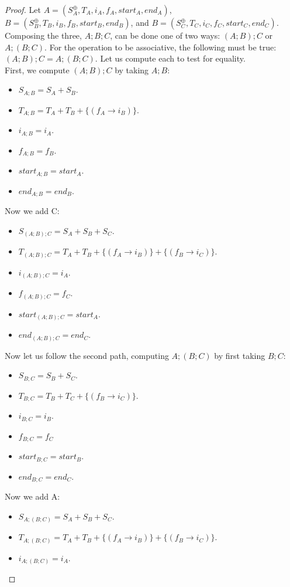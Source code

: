 \begin{proof}
Let $A = (S_A^\oplus, T_A, i_A, f_A, start_A, end_A)$, $B = (S_B^\oplus, T_B, i_B, f_B, start_B, end_B)$, and $B = (S_C^\oplus, T_C, i_C, f_C, start_C, end_C)$. Composing the three, $A;B;C$, can be done one of two ways: $(A;B);C$ or $ A;(B;C)$. For the operation to be associative, the following must be true: $(A;B);C = A;(B;C).$ Let us compute each to test for equality.\\
First, we compute $(A;B);C$ by taking $A;B$:
\begin{itemize}
 \item $S_{A;B} = S_A + S_B.$
 \item $T_{A;B} = T_A + T_B + \{(f_A \to i_B)\}$.
 \item $i_{A;B} = i_A$.
 \item $f_{A;B} = f_B$.
 \item $start_{A;B} = start_A.$
 \item $end_{A;B} = end_B. $
\end{itemize} 
Now we add C:
\begin{itemize}
 \item $S_{(A;B);C} = S_A + S_B + S_C.$
 \item $T_{(A;B);C} = T_A + T_B + \{(f_A \to i_B)\} + \{(f_B \to i_C)\}.$ 
 \item $i_{(A;B);C} = i_A$.
 \item $f_{(A;B);C} = f_C$.
 \item $start_{(A;B);C} = start_A.$
 \item $end_{(A;B);C} = end_C. $
\end{itemize}
Now let us follow the second path, computing $A;(B;C)$ by first taking $B;C$:
\begin{itemize}
 \item $S_{B;C} = S_B + S_C.$
 \item $T_{B;C} = T_B + T_C + \{(f_B \to i_C)\}.$
 \item $i_{B;C} = i_B$.
 \item $f_{B;C} = f_C$
 \item $start_{B;C} = start_B.$
 \item $end_{B;C} = end_C.$ 
\end{itemize} 
Now we add A:
\begin{itemize}
 \item $S_{A;(B;C)} = S_A + S_B + S_C.$
 \item $T_{A;(B;C)} = T_A + T_B + \{(f_A \to i_B)\} + \{(f_B \to i_C)\}.$
 \item $i_{A;(B;C)} = i_A$.

\end{itemize}
\end{proof}
